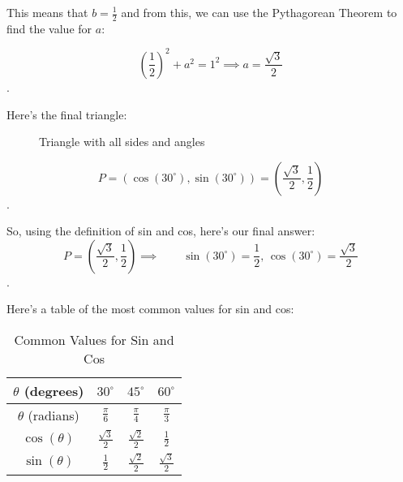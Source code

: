 \newpage

This means that $b = \frac{1}{2}$ and from this, we can use the Pythagorean
Theorem to find the value for $a$:

\[ \left(\frac{1}{2}\right)^{2} + a^{2} = 1^{2} \implies a = \frac{\sqrt{3}}{2} \].

Here's the final triangle:

\begin{figure}[htpb]
  \centering


  \caption{Triangle with all sides and angles}
  \label{fig:final_triangle}
\end{figure}

\newpage

\[ P = (\cos (30^{\circ}), \sin (30^{\circ})) = \left(\frac{\sqrt{3}}{2}, \frac{1}{2}\right) \].

So, using the definition of sin and cos, here's our final answer:
\[ P = \left(\frac{\sqrt{3}}{2}, \frac{1}{2}\right) \implies\qquad\sin (30^{\circ}) = \frac{1}{2} \textrm{, } \cos (30^{\circ}) = \frac{\sqrt{3}}{2} \].

Here's a table of the most common values for sin and cos:

\begin{table}[htpb]
  \label{tab:common_values_for_sin_and_cos}
  \centering

  \begin{tabular}{|c|c|c|c|}
    \hline
    $\theta$ (degrees) & $30^{\circ}$ & $45^{\circ}$ & $60^{\circ}$ \\
    \hline
    $\theta$ (radians) & $\frac{\pi}{6}$ & $\frac{\pi}{4}$ & $\frac{\pi}{3}$ \\
    \hline
    $\cos (\theta)$ & $\frac{\sqrt{3}}{2}$ & $\frac{\sqrt{2}}{2}$ & $\frac{1}{2}$ \\
    \hline
    $\sin (\theta)$ & $\frac{1}{2}$ & $\frac{\sqrt{2}}{2}$ & $\frac{\sqrt{3}}{2}$ \\
    \hline
  \end{tabular}

  \caption{Common Values for Sin and Cos}
\end{table}

